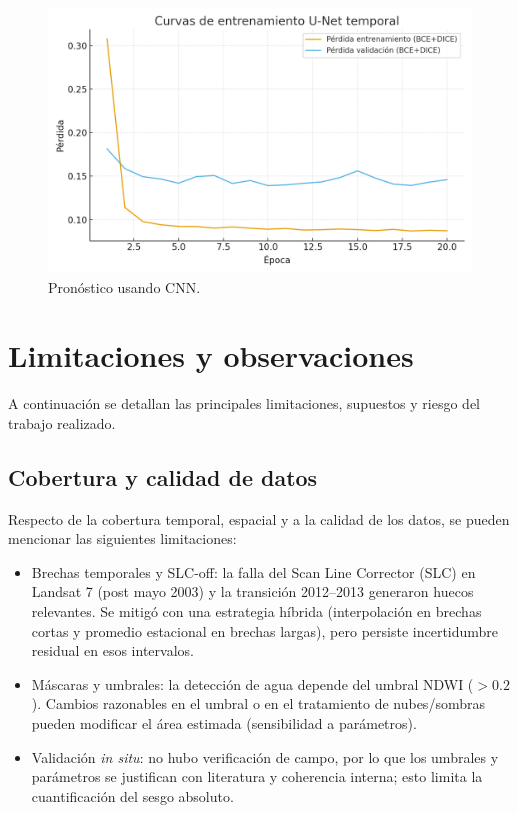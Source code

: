 \begin{figure}[H]
    \centering
    \includegraphics[scale=0.50]{Figures/curva_unet.png}
    \caption{Pronóstico usando CNN.}
    \label{fig:curva_unet}
\end{figure}




\section{Limitaciones y observaciones}
A continuación se detallan las principales limitaciones,  supuestos y riesgo del trabajo realizado.

\subsection{Cobertura y calidad de datos}
Respecto de la cobertura temporal, espacial y a la calidad de los datos, se pueden mencionar las siguientes limitaciones:
\begin{itemize}
    \item Brechas temporales y SLC-off: la falla del Scan Line Corrector (SLC) en Landsat 7 (post mayo 2003) y la transición 2012–2013 generaron huecos relevantes. Se mitigó con una estrategia híbrida (interpolación en brechas cortas y promedio estacional en brechas largas), pero persiste incertidumbre residual en esos intervalos.
    \item Máscaras y umbrales: la detección de agua depende del umbral NDWI ($>0.2$). Cambios razonables en el umbral o en el tratamiento de nubes/sombras pueden modificar el área estimada (sensibilidad a parámetros).
    \item Validación \textit{in situ}: no hubo verificación de campo, por lo que los umbrales y parámetros se justifican con literatura y coherencia interna; esto limita la cuantificación del sesgo absoluto.
\end{itemize}

